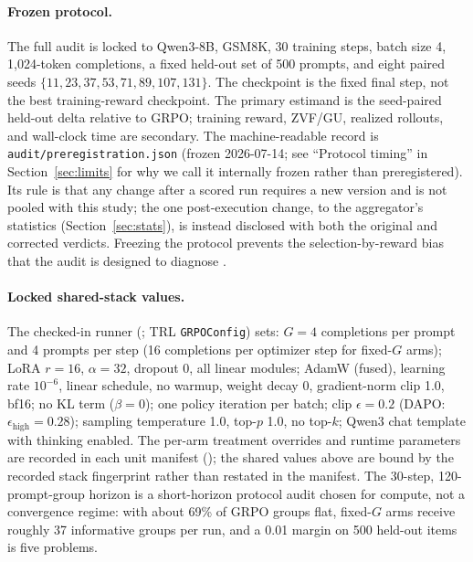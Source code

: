 \documentclass[11pt]{article}
\newcommand{\zvf}{\textnormal{ZVF}}
\newcommand{\gu}{\textnormal{GU}}
\begin{document}
\begin{sloppypar}
\paragraph{Frozen protocol.} The full audit is locked to Qwen3-8B, GSM8K,
30 training steps, batch size 4, 1,024-token completions, a fixed held-out set
of 500 prompts, and eight paired seeds
$\{11,23,37,53,71,89,107,131\}$. The checkpoint is the fixed final step, not
the best training-reward checkpoint. The primary estimand is the seed-paired
held-out delta relative to GRPO; training reward, \zvf/\gu{}, realized rollouts,
and wall-clock time are secondary. The machine-readable record is
\texttt{audit/preregistration.json} (frozen 2026-07-14; see ``Protocol timing''
in Section~\ref{sec:limits} for why we call it internally frozen rather than
preregistered). Its rule is that any change after a scored run requires a new
version and is not pooled with this study; the one post-execution change, to
the aggregator's statistics (Section~\ref{sec:stats}), is instead disclosed
with both the original and corrected verdicts. Freezing the protocol prevents
the selection-by-reward bias that the audit is designed to diagnose
\cite{zvfaudit2026}.
\end{sloppypar}

\paragraph{Locked shared-stack values.} The checked-in runner
(; TRL
\texttt{GRPOConfig}) sets: $G{=}4$ completions per prompt and 4 prompts per
step (16 completions per optimizer step for fixed-$G$ arms); LoRA $r{=}16$,
$\alpha{=}32$, dropout 0, all linear modules; AdamW (fused), learning rate
$10^{-6}$, linear schedule, no warmup, weight decay 0, gradient-norm clip 1.0,
bf16; no KL term ($\beta{=}0$); one policy iteration per batch; clip
$\epsilon{=}0.2$ (DAPO: $\epsilon_{\text{high}}{=}0.28$); sampling temperature
1.0, top-$p$ 1.0, no top-$k$; Qwen3 chat template with thinking enabled. The
per-arm treatment overrides and runtime parameters are recorded in each unit
manifest (); the shared values
above are bound by the recorded stack fingerprint rather than restated in the
manifest. The 30-step, 120-prompt-group horizon is a short-horizon protocol
audit chosen for compute, not a convergence regime: with about 69\% of GRPO
groups flat, fixed-$G$ arms receive roughly 37 informative groups per run, and
a 0.01 margin on 500 held-out items is five problems.
\end{document}
